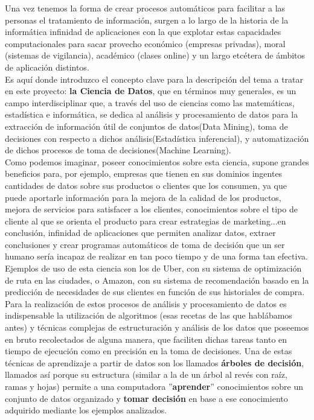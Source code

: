 Una vez tenemos la forma de crear procesos automáticos para facilitar a las personas el tratamiento de información, surgen a lo largo de la historia de la informática infinidad de aplicaciones con la que explotar estas capacidades computacionales para sacar provecho económico (empresas privadas), moral (sistemas de vigilancia), académico (clases online) y un largo etcétera de ámbitos de aplicación distintos.\\
Es aquí donde introduzco el concepto clave para la descripción del tema a tratar en este proyecto: \textbf{la Ciencia de Datos}, que en términos muy generales, es un campo interdisciplinar que, a través del uso de ciencias como las matemáticas, estadística e informática, se dedica al análisis y procesamiento de datos para la extracción de información útil de conjuntos de datos(Data Mining), toma de decisiones con respecto a dichos análisis(Estadística inferencial), y automatización de dichos procesos de toma de decisiones(Machine Learning).\\

Como podemos imaginar, poseer conocimientos sobre esta ciencia, supone grandes beneficios para, por ejemplo, empresas que tienen en sus dominios ingentes cantidades de datos sobre sus productos o clientes que los consumen, ya que puede aportarle información para la mejora de la calidad de los productos, mejora de servicios para satisfacer a los clientes, conocimientos sobre el tipo de cliente al que se orienta el producto para crear estrategias de marketing...en conclusión, infinidad de aplicaciones que permiten analizar datos, extraer conclusiones y crear programas automáticos de toma de decisión que un ser humano sería incapaz de realizar en tan poco tiempo y de una forma tan efectiva. Ejemplos de uso de esta ciencia son los de Uber, con su sistema de optimización de ruta en las ciudades, o Amazon, con su sistema de recomendación basado en la predicción de necesidades de sus clientes en función de sus historiales de compra.\\

Para la realización de estos procesos de análisis y procesamiento de datos es indispensable la utilización de algoritmos (esas recetas de las que hablábamos antes) y técnicas complejas de estructuración y análisis de los datos que poseemos en bruto recolectados de alguna manera, que faciliten dichas tareas tanto en tiempo de ejecución como en precisión en la toma de decisiones. Una de estas técnicas de aprendizaje a partir de datos son los llamados \textbf{árboles de decisión}, llamados así porque su estructura (similar a la de un árbol al revés con raíz, ramas y hojas) permite a una computadora ''\textbf{aprender}'' conocimientos sobre un conjunto de datos organizado y \textbf{tomar decisión} en base a ese conocimiento adquirido mediante los ejemplos analizados.\\

